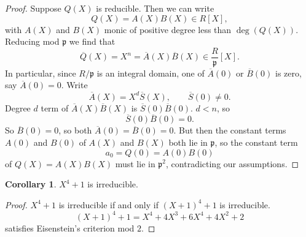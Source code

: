 \documentclass{article}
\newcommand{\rb}[1]{\left( #1 \right)}
\renewcommand{\sb}[1]{\left[ #1 \right]}
\theoremstyle{definition}\newtheorem{definition}{Definition}[subsection]
\theoremstyle{definition}\newtheorem{remark}[definition]{Remark}
\theoremstyle{definition}\newtheorem*{example}{Example}
\theoremstyle{definition}\newtheorem*{note}{Note}
\newtheorem{corollary}[definition]{Corollary}
\begin{document}
\begin{proof}
Suppose $ Q\rb{X} $ is reducible. Then we can write
$$ Q\rb{X} = A\rb{X}B\rb{X} \in R\sb{X}, $$
with $ A\rb{X} $ and $ B\rb{X} $ monic of positive degree less than $ \deg\rb{Q\rb{X}} $. Reducing mod $ \mathfrak{p} $ we find that
$$ \overline{Q}\rb{X} = X^n = \overline{A}\rb{X}\overline{B}\rb{X} \in \dfrac{R}{\mathfrak{p}}\sb{X}. $$
In particular, since $ R / \mathfrak{p} $ is an integral domain, one of $ \overline{A}\rb{0} $ or $ \overline{B}\rb{0} $ is zero, say $ \overline{A}\rb{0} = 0 $. Write
$$ \overline{A}\rb{X} = X^d\overline{S}\rb{X}, \qquad \overline{S}\rb{0} \ne 0. $$
Degree $ d $ term of $ \overline{A}\rb{X}\overline{B}\rb{X} $ is $ \overline{S}\rb{0}\overline{B}\rb{0} $. $ d < n $, so
$$ \overline{S}\rb{0}\overline{B}\rb{0} = 0. $$
So $ \overline{B}\rb{0} = 0 $, so both $ \overline{A}\rb{0} = \overline{B}\rb{0} = 0 $. But then the constant terms $ A\rb{0} $ and $ B\rb{0} $ of $ A\rb{X} $ and $ B\rb{X} $ both lie in $ \mathfrak{p} $, so the constant term
$$ a_0 = Q\rb{0} = A\rb{0}B\rb{0} $$
of $ Q\rb{X} = A\rb{X}B\rb{X} $ must lie in $ \mathfrak{p}^2 $, contradicting our assumptions.
\end{proof}

\begin{corollary}
$ X^4 + 1 $ is irreducible.
\end{corollary}

\begin{proof}
$ X^4 + 1 $ is irreducible if and only if $ \rb{X + 1}^4 + 1 $ is irreducible.
$$ \rb{X + 1}^4 + 1 = X^4 + 4X^3 + 6X^4 + 4X^2 + 2 $$
satisfies Eisenstein's criterion mod $ 2 $.
\end{proof}

\end{document}
